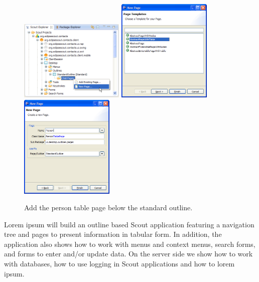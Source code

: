 \documentclass[a4paper,10pt,twoside]{book}
\begin{document}
\begin{figure}
\includegraphics[width=5cm]{new_page_person_contextmenu.png} \hspace{2mm}
\includegraphics[width=4.5cm]{new_page_person_1.png} \hspace{2mm}
\includegraphics[width=4.5cm]{new_page_person_2.png}
\caption{Add the person table page below the standard outline. }
\end{figure}

Lorem ipsum will build an outline based Scout application featuring a navigation tree and pages to present information in tabular form. 
In addition, the application also shows how to work with menus and context menus, search forms, and forms to enter and/or update data. 
On the server side we show how to work with databases, how to use logging in Scout applications and how to lorem ipsum. 
\end{document}
